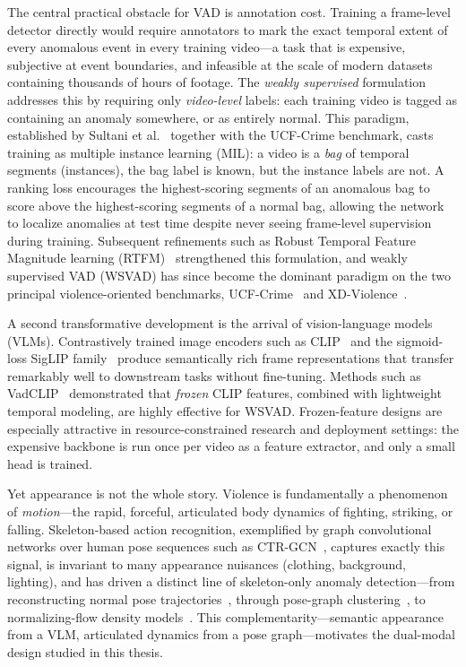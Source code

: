 The central practical obstacle for VAD is annotation cost. Training a frame-level detector directly
would require annotators to mark the exact temporal extent of every anomalous event in every
training video---a task that is expensive, subjective at event boundaries, and infeasible at the
scale of modern datasets containing thousands of hours of footage. The \emph{weakly supervised}
formulation addresses this by requiring only \emph{video-level} labels: each training video is
tagged as containing an anomaly somewhere, or as entirely normal. This paradigm, established by
Sultani et al.~\cite{sultani2018ucfcrime} together with the UCF-Crime benchmark, casts training as
multiple instance learning (MIL): a video is a \emph{bag} of temporal segments (instances), the bag
label is known, but the instance labels are not. A ranking loss encourages the highest-scoring
segments of an anomalous bag to score above the highest-scoring segments of a normal bag, allowing
the network to localize anomalies at test time despite never seeing frame-level supervision during
training. Subsequent refinements such as Robust Temporal Feature Magnitude learning
(RTFM)~\cite{tian2021rtfm} strengthened this formulation, and weakly supervised VAD (WSVAD) has
since become the dominant paradigm on the two principal violence-oriented benchmarks,
UCF-Crime~\cite{sultani2018ucfcrime} and XD-Violence~\cite{wu2020xdviolence}.

A second transformative development is the arrival of vision-language models (VLMs). Contrastively
trained image encoders such as CLIP~\cite{radford2021clip} and the sigmoid-loss SigLIP
family~\cite{zhai2023siglip,tschannen2025siglip2} produce semantically rich frame representations
that transfer remarkably well to downstream tasks without fine-tuning. Methods such as
VadCLIP~\cite{wu2024vadclip} demonstrated that \emph{frozen} CLIP features, combined with
lightweight temporal modeling, are highly effective for WSVAD. Frozen-feature designs are especially
attractive in resource-constrained research and deployment settings: the expensive backbone is run
once per video as a feature extractor, and only a small head is trained.

Yet appearance is not the whole story. Violence is fundamentally a phenomenon of \emph{motion}---the
rapid, forceful, articulated body dynamics of fighting, striking, or falling. Skeleton-based action
recognition, exemplified by graph convolutional networks over human pose sequences such as
CTR-GCN~\cite{chen2021ctrgcn}, captures exactly this signal, is invariant to many appearance
nuisances (clothing, background, lighting), and has driven a distinct line of skeleton-only
anomaly detection---from reconstructing normal pose
trajectories~\cite{morais2019skeleton}, through pose-graph
clustering~\cite{markovitz2020gepc}, to normalizing-flow density
models~\cite{hirschorn2023stgnf}. This complementarity---semantic appearance from a
VLM, articulated dynamics from a pose graph---motivates the dual-modal design studied in this
thesis.

